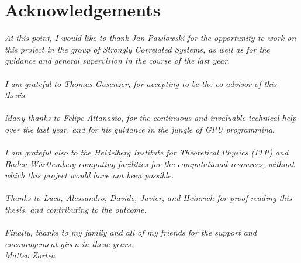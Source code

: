 \documentclass[
11pt, %
english, %
singlespacing, %
headsepline, %
]{MastersDoctoralThesis} %
\begin{document}




\mainmatter %

\pagestyle{thesis} %











\chapter*{Acknowledgements}
\thispagestyle{empty}
\vspace*{0.2\textheight}
\noindent\textit{At this point, I would like to thank Jan Pawlowski for the opportunity to work on this project in the group of Strongly Correlated Systems, as well as for the guidance and general supervision in the course of the last year. \\~\\ 
I am grateful to Thomas Gasenzer, for accepting to be the co-advisor of this thesis. \\~\\ 
Many thanks to Felipe Attanasio, for the continuous and invaluable technical help over the last year, and for his guidance in the jungle of GPU programming. \\~\\
I am grateful also to the Heidelberg Institute for Theoretical Physics (ITP) and Baden-W\"urttemberg computing facilities for the computational resources, without which this project would have not been possible. \\~\\
Thanks to Luca, Alessandro, Davide, Javier, and Heinrich for proof-reading this thesis, and contributing to the outcome. \\~\\ 
Finally, thanks to my family and all of my friends for the support and encouragement given in these years. \\[3cm]
\vspace{50pt}
\hfill Matteo Zortea}
\end{document}
